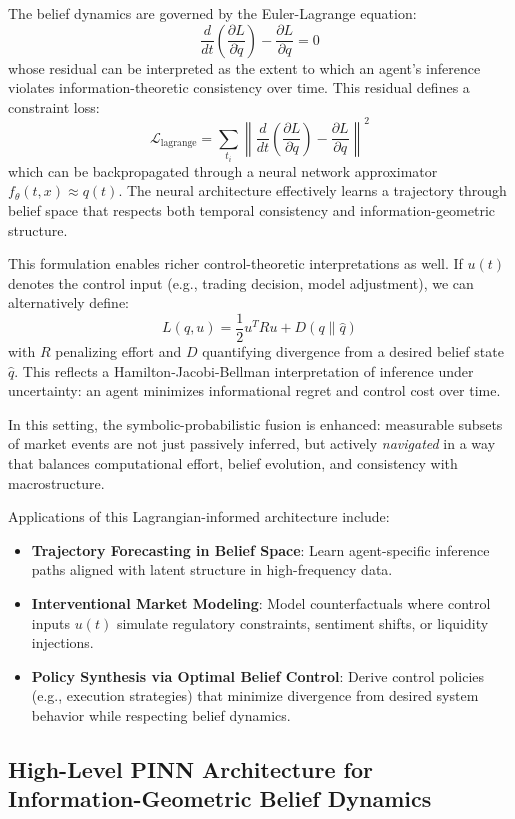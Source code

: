 The belief dynamics are governed by the Euler-Lagrange equation:
\[
\frac{d}{dt} \left( \frac{\partial L}{\partial \dot{q}} \right) - \frac{\partial L}{\partial q} = 0
\]
whose residual can be interpreted as the extent to which an agent's inference violates information-theoretic consistency over time. This residual defines a constraint loss:
\[
\mathcal{L}_{\text{lagrange}} = \sum_{t_i} \left\| \frac{d}{dt} \left( \frac{\partial L}{\partial \dot{q}} \right) - \frac{\partial L}{\partial q} \right\|^2
\]
which can be backpropagated through a neural network approximator \( f_\theta(t, x) \approx q(t) \). The neural architecture effectively learns a trajectory through belief space that respects both temporal consistency and information-geometric structure.

This formulation enables richer control-theoretic interpretations as well. If \( u(t) \) denotes the control input (e.g., trading decision, model adjustment), we can alternatively define:
\[
L(q, u) = \frac{1}{2} u^T R u + D(q \parallel \hat{q})
\]
with \( R \) penalizing effort and \( D \) quantifying divergence from a desired belief state \( \hat{q} \). This reflects a Hamilton-Jacobi-Bellman interpretation of inference under uncertainty: an agent minimizes informational regret and control cost over time.

In this setting, the symbolic-probabilistic fusion is enhanced: measurable subsets of market events are not just passively inferred, but actively \emph{navigated} in a way that balances computational effort, belief evolution, and consistency with macrostructure.

Applications of this Lagrangian-informed architecture include:
\begin{itemize}
    \item \textbf{Trajectory Forecasting in Belief Space}: Learn agent-specific inference paths aligned with latent structure in high-frequency data.
    \item \textbf{Interventional Market Modeling}: Model counterfactuals where control inputs \( u(t) \) simulate regulatory constraints, sentiment shifts, or liquidity injections.
    \item \textbf{Policy Synthesis via Optimal Belief Control}: Derive control policies (e.g., execution strategies) that minimize divergence from desired system behavior while respecting belief dynamics.
\end{itemize}



\subsection{High-Level PINN Architecture for Information-Geometric Belief Dynamics}

